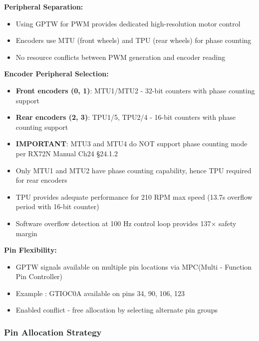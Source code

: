 \textbf{Peripheral Separation:}
\begin{itemize}
    \item Using GPTW for PWM provides dedicated high-resolution motor control
    \item Encoders use MTU (front wheels) and TPU (rear wheels) for phase counting
    \item No resource conflicts between PWM generation and encoder reading
\end{itemize}

    \textbf{Encoder Peripheral Selection:}
    \begin{itemize}
    \item \textbf{Front encoders (0, 1)}: MTU1/MTU2 - 32-bit counters with phase counting support
    \item \textbf{Rear encoders (2, 3)}: TPU1/5, TPU2/4 - 16-bit counters with phase counting support
    \item \textbf{IMPORTANT}: MTU3 and MTU4 do NOT support phase counting mode per RX72N Manual Ch24 \S24.1.2
    \item Only MTU1 and MTU2 have phase counting capability, hence TPU required for rear encoders
    \item TPU provides adequate performance for 210 RPM max speed (13.7s overflow period with 16-bit counter)
    \item Software overflow detection at 100 Hz control loop provides 137$\times$ safety margin
\end{itemize}

    \textbf{Pin Flexibility:}
    \begin{itemize}
    \item GPTW signals available on multiple pin locations via
    MPC(Multi - Function Pin Controller)
    \item Example : GTIOC0A available on pins 34,
                     90,
                     106,
                     123
    \item Enabled conflict - free allocation by selecting alternate pin groups
\end{itemize}

    \subsubsection{Pin Allocation Strategy}

